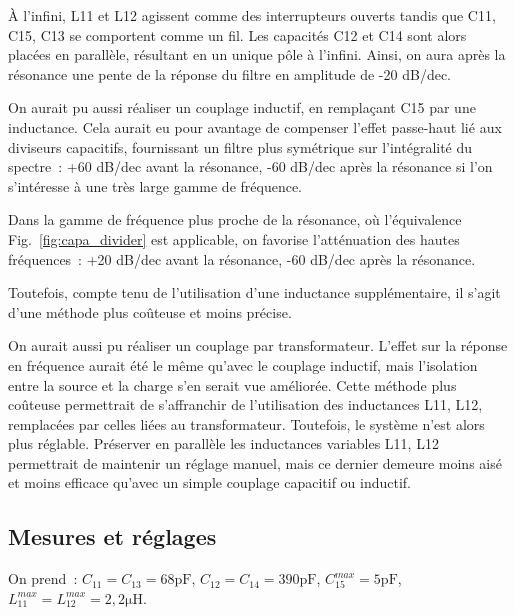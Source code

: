 \documentclass{article}
\begin{document}
À l'infini, L11 et L12 agissent comme des interrupteurs ouverts tandis que C11, C15, C13 se comportent comme un fil. Les capacités C12 et C14 sont alors placées en parallèle, résultant en un unique pôle à l'infini. Ainsi, on aura après la résonance une pente de la réponse du filtre en amplitude de -20 dB/dec.



On aurait pu aussi réaliser un couplage inductif, en remplaçant C15 par une inductance. Cela aurait eu pour avantage de compenser l'effet passe-haut lié aux diviseurs capacitifs, fournissant un filtre plus symétrique sur l'intégralité du spectre~: +60 dB/dec avant la résonance, -60 dB/dec après la résonance si l'on s'intéresse à une très large gamme de fréquence.

Dans la gamme de fréquence plus proche de la résonance, où l'équivalence Fig.~\ref{fig:capa_divider} est applicable, on favorise l'atténuation des hautes fréquences~: +20 dB/dec avant la résonance, -60 dB/dec après la résonance.

Toutefois, compte tenu de l'utilisation d'une inductance supplémentaire, il s'agit d'une méthode plus coûteuse et moins précise.

On aurait aussi pu réaliser un couplage par transformateur. L'effet sur la réponse en fréquence aurait été le même qu'avec le couplage inductif, mais l'isolation entre la source et la charge s'en serait vue améliorée. Cette méthode plus coûteuse permettrait de s'affranchir de l'utilisation des inductances L11, L12, remplacées par celles liées au transformateur. Toutefois, le système n'est alors plus réglable. Préserver en parallèle les inductances variables L11, L12 permettrait de maintenir un réglage manuel, mais ce dernier demeure moins aisé et moins efficace qu'avec un simple couplage capacitif ou inductif.






\subsection{Mesures et réglages}


On prend~: $C_{11}=C_{13}=68\mathrm{pF}$, $C_{12}=C_{14}=390\mathrm{pF}$, $C_{15}^{max}=5\mathrm{pF}$, $L_{11}^{max}=L_{12}^{max}=2,2\mathrm{\mu H}$.
\end{document}
